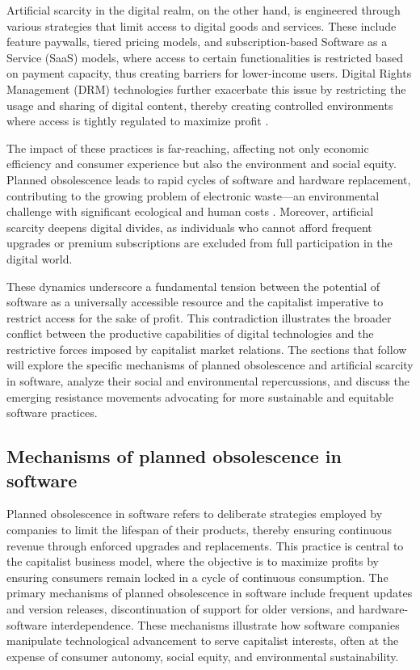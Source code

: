 \begin{refsection}
Artificial scarcity in the digital realm, on the other hand, is engineered through various strategies that limit access to digital goods and services. These include feature paywalls, tiered pricing models, and subscription-based Software as a Service (SaaS) models, where access to certain functionalities is restricted based on payment capacity, thus creating barriers for lower-income users. Digital Rights Management (DRM) technologies further exacerbate this issue by restricting the usage and sharing of digital content, thereby creating controlled environments where access is tightly regulated to maximize profit \cite[pp.~12-15]{doctorow2014information}.

The impact of these practices is far-reaching, affecting not only economic efficiency and consumer experience but also the environment and social equity. Planned obsolescence leads to rapid cycles of software and hardware replacement, contributing to the growing problem of electronic waste—an environmental challenge with significant ecological and human costs \cite[pp.~210-215]{slade2009made}. Moreover, artificial scarcity deepens digital divides, as individuals who cannot afford frequent upgrades or premium subscriptions are excluded from full participation in the digital world.

These dynamics underscore a fundamental tension between the potential of software as a universally accessible resource and the capitalist imperative to restrict access for the sake of profit. This contradiction illustrates the broader conflict between the productive capabilities of digital technologies and the restrictive forces imposed by capitalist market relations. The sections that follow will explore the specific mechanisms of planned obsolescence and artificial scarcity in software, analyze their social and environmental repercussions, and discuss the emerging resistance movements advocating for more sustainable and equitable software practices.

\subsection{Mechanisms of planned obsolescence in software}

Planned obsolescence in software refers to deliberate strategies employed by companies to limit the lifespan of their products, thereby ensuring continuous revenue through enforced upgrades and replacements. This practice is central to the capitalist business model, where the objective is to maximize profits by ensuring consumers remain locked in a cycle of continuous consumption. The primary mechanisms of planned obsolescence in software include frequent updates and version releases, discontinuation of support for older versions, and hardware-software interdependence. These mechanisms illustrate how software companies manipulate technological advancement to serve capitalist interests, often at the expense of consumer autonomy, social equity, and environmental sustainability.


\end{refsection}
